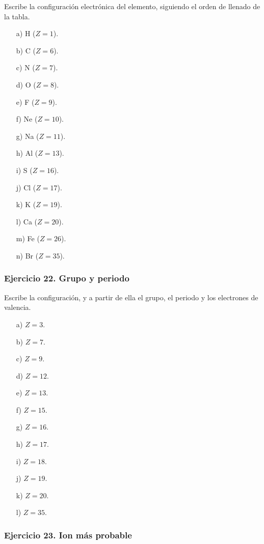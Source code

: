 Escribe la configuración electrónica del elemento,
siguiendo el orden de llenado de la tabla.

\begin{enumerate}
    \item[a)] H ($Z=1$).
    \item[b)] C ($Z=6$).
    \item[c)] N ($Z=7$).
    \item[d)] O ($Z=8$).
    \item[e)] F ($Z=9$).
    \item[f)] Ne ($Z=10$).
    \item[g)] Na ($Z=11$).
    \item[h)] Al ($Z=13$).
    \item[i)] S ($Z=16$).
    \item[j)] Cl ($Z=17$).
    \item[k)] K ($Z=19$).
    \item[l)] Ca ($Z=20$).
    \item[m)] Fe ($Z=26$).
    \item[n)] Br ($Z=35$).
\end{enumerate}

\subsubsection*{Ejercicio 22. Grupo y periodo}

Escribe la configuración, y a partir de ella el grupo,
el periodo y los electrones de valencia.

\begin{enumerate}
    \item[a)] $Z=3$.
    \item[b)] $Z=7$.
    \item[c)] $Z=9$.
    \item[d)] $Z=12$.
    \item[e)] $Z=13$.
    \item[f)] $Z=15$.
    \item[g)] $Z=16$.
    \item[h)] $Z=17$.
    \item[i)] $Z=18$.
    \item[j)] $Z=19$.
    \item[k)] $Z=20$.
    \item[l)] $Z=35$.
\end{enumerate}

\subsubsection*{Ejercicio 23. Ion más probable}

